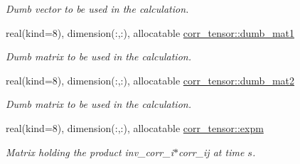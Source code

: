 \begin{DoxyCompactItemize}
\begin{DoxyCompactList}\small\item\em Dumb vector to be used in the calculation. \end{DoxyCompactList}\item 
real(kind=8), dimension(\+:,\+:), allocatable \hyperlink{namespacecorr__tensor_aa0f6f11b738412d93dbd832a961d6e78}{corr\+\_\+tensor\+::dumb\+\_\+mat1}
\begin{DoxyCompactList}\small\item\em Dumb matrix to be used in the calculation. \end{DoxyCompactList}\item 
real(kind=8), dimension(\+:,\+:), allocatable \hyperlink{namespacecorr__tensor_ad46767b09e31f58c53a5a27b12709e30}{corr\+\_\+tensor\+::dumb\+\_\+mat2}
\begin{DoxyCompactList}\small\item\em Dumb matrix to be used in the calculation. \end{DoxyCompactList}\item 
real(kind=8), dimension(\+:,\+:), allocatable \hyperlink{namespacecorr__tensor_acab3c2a99b90ed8bfc314f41de01e510}{corr\+\_\+tensor\+::expm}
\begin{DoxyCompactList}\small\item\em Matrix holding the product inv\+\_\+corr\+\_\+i$\ast$corr\+\_\+ij at time $s$. \end{DoxyCompactList}\end{DoxyCompactItemize}
